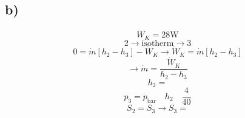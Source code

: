 

\subsection*{b)}
\[
\dot{W}_K = 28 \text{W}
\]
\[
2 \rightarrow \text{isotherm} \rightarrow 3
\]
\[
0 = \dot{m} [h_2 - h_3] - \dot{W}_K \rightarrow \dot{W}_K = \dot{m} [h_2 - h_3]
\]
\[
\rightarrow \dot{m} = \frac{\dot{W}_K}{h_2 - h_3}
\]
\[
h_2 = 
\]
\[
p_3 = p_{\text{bar}} \quad h_2 \quad \frac{4}{40}
\]
\[
S_2 = S_3 \rightarrow S_3 = 
\]